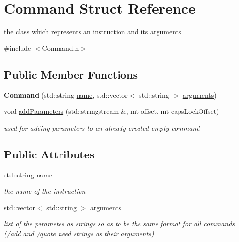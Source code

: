 \hypertarget{struct_command}{}\section{Command Struct Reference}
\label{struct_command}


the class which represents an instruction and its arguments  




{\ttfamily \#include $<$Command.\+h$>$}

\subsection*{Public Member Functions}
\begin{DoxyCompactItemize}
\item 
\mbox{\label{struct_command_a03c4b22bae4643d28b7e2d026c4d6733}} 
{\bfseries Command} (std\+::string \mbox{\hyperlink{struct_command_a8d66550a9895cbd96373a9a221fa2b25}{name}}, std\+::vector$<$ std\+::string $>$ \mbox{\hyperlink{struct_command_aefe1088200a0ac8d6305ddc4bfeccbf8}{arguments}})
\item 
\mbox{\label{struct_command_a972afb9476a646bac95c0aac1575ac70}} 
void \mbox{\hyperlink{struct_command_a972afb9476a646bac95c0aac1575ac70}{add\+Parameters}} (std\+::stringstream \&, int offset, int caps\+Lock\+Offset)
\begin{DoxyCompactList}\small\item\em used for adding parameters to an already created empty command \end{DoxyCompactList}\end{DoxyCompactItemize}
\subsection*{Public Attributes}
\begin{DoxyCompactItemize}
\item 
\mbox{\label{struct_command_a8d66550a9895cbd96373a9a221fa2b25}} 
std\+::string \mbox{\hyperlink{struct_command_a8d66550a9895cbd96373a9a221fa2b25}{name}}
\begin{DoxyCompactList}\small\item\em the name of the instruction \end{DoxyCompactList}\item 
\mbox{\label{struct_command_aefe1088200a0ac8d6305ddc4bfeccbf8}} 
std\+::vector$<$ std\+::string $>$ \mbox{\hyperlink{struct_command_aefe1088200a0ac8d6305ddc4bfeccbf8}{arguments}}
\begin{DoxyCompactList}\small\item\em list of the parametes as strings so as to be the same format for all commands (/add and /quote need strings as their arguments) \end{DoxyCompactList}\end{DoxyCompactItemize}


